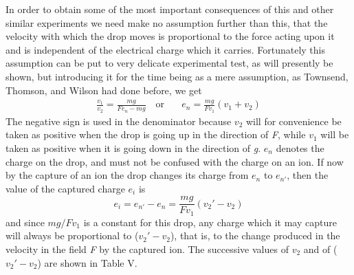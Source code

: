 In order to obtain some of the most important consequences of this and
other similar experiments we need make no assumption further than this,
that the velocity with which the drop moves is proportional to the force
acting upon it and is independent of the electrical charge which it
carries. Fortunately this assumption can be put to very delicate
experimental test, as will presently be shown, but introducing it for
the time being as a mere assumption, as Townsend, Thomson, and Wilson
had done before, we get
%
\begin{align*}\tag{9}
\frac{v_1}{v_2} = \frac{mg}{Fe_n-mg} \quad\text{or}\quad & e_n = \frac{mg}{Fv_1}(v_1+v_2)
\end{align*}
%
The negative sign is used in the denominator because $v_2$ will for
convenience be taken as positive when the drop is going up in the
direction of \emph{F}, while $v_1$ will be taken as positive when it
is going down in the direction of \emph{g}. $e_n$ denotes the charge
on the drop, and must not be confused with the charge on an ion. If now
by the capture of an ion the drop changes its charge from $e_n$ to
$e_{n'}$, then the value of the captured charge $e_i$ is
\begin{equation*}\tag{10}
e_i = e_{n'}-e_n=\frac{mg}{Fv_1}(v_{2}'-v_2)
\end{equation*}
and since $mg/Fv_1$ is a constant for this drop, any charge which it
may capture will always be proportional to ($v_{2}'-v_2$),
that is, to the change produced in the velocity in the field \emph{F} by
the captured ion. The successive values of $v_2$ and of ($v_{2}'-v_2$) 
are shown in Table V.

